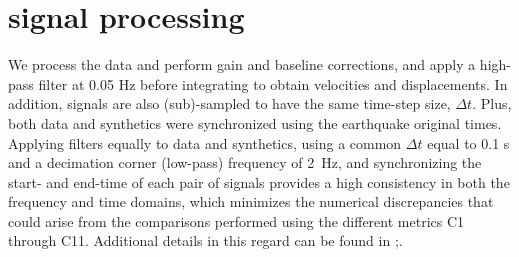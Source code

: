 
\section{signal processing}

We process the data and perform gain and baseline corrections, and apply a high-pass filter at 0.05 Hz before integrating to obtain velocities and displacements. In addition, signals are also (sub)-sampled to have the same time-step size, $\Delta t$. Plus, both data and synthetics were synchronized using the earthquake original times. Applying filters equally to data and synthetics, using a common $\Delta t$ equal to 0.1 s and a decimation corner (low-pass) frequency of 2~Hz, and synchronizing the start- and end-time of each pair of signals provides a high consistency in both the frequency and time domains, which minimizes the numerical discrepancies that could arise from the comparisons performed using the different metrics C1 through C11. Additional details in this regard can be found in \citet{Taborda_2016}\citet{Anderson_2004_Proc};\citet{Taborda_2013_BSSA}.